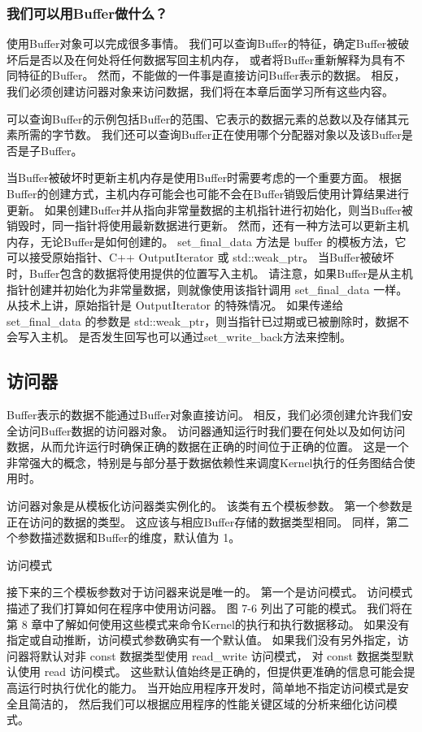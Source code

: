 \subsubsection{我们可以用Buffer做什么？}
使用Buffer对象可以完成很多事情。 我们可以查询Buffer的特征，确定Buffer被破坏后是否以及在何处将任何数据写回主机内存，
或者将Buffer重新解释为具有不同特征的Buffer。 然而，不能做的一件事是直接访问Buffer表示的数据。 
相反，我们必须创建访问器对象来访问数据，我们将在本章后面学习所有这些内容。

可以查询Buffer的示例包括Buffer的范围、它表示的数据元素的总数以及存储其元素所需的字节数。 
我们还可以查询Buffer正在使用哪个分配器对象以及该Buffer是否是子Buffer。

当Buffer被破坏时更新主机内存是使用Buffer时需要考虑的一个重要方面。 
根据Buffer的创建方式，主机内存可能会也可能不会在Buffer销毁后使用计算结果进行更新。 
如果创建Buffer并从指向非常量数据的主机指针进行初始化，则当Buffer被销毁时，同一指针将使用最新数据进行更新。 
然而，还有一种方法可以更新主机内存，无论Buffer是如何创建的。 
set\_final\_data 方法是 buffer 的模板方法，它可以接受原始指针、C++ OutputIterator 或 std::weak\_ptr。 
当Buffer被破坏时，Buffer包含的数据将使用提供的位置写入主机。 
请注意，如果Buffer是从主机指针创建并初始化为非常量数据，则就像使用该指针调用 set\_final\_data 一样。 
从技术上讲，原始指针是 OutputIterator 的特殊情况。 
如果传递给 set\_final\_data 的参数是 std::weak\_ptr，则当指针已过期或已被删除时，数据不会写入主机。 
是否发生回写也可以通过set\_write\_back方法来控制。

\subsection{访问器}
Buffer表示的数据不能通过Buffer对象直接访问。 相反，我们必须创建允许我们安全访问Buffer数据的访问器对象。 
访问器通知运行时我们要在何处以及如何访问数据，从而允许运行时确保正确的数据在正确的时间位于正确的位置。 
这是一个非常强大的概念，特别是与部分基于数据依赖性来调度Kernel执行的任务图结合使用时。

访问器对象是从模板化访问器类实例化的。 该类有五个模板参数。 第一个参数是正在访问的数据的类型。 
这应该与相应Buffer存储的数据类型相同。 同样，第二个参数描述数据和Buffer的维度，默认值为 1。

{\color{red} 访问模式}

接下来的三个模板参数对于访问器来说是唯一的。 第一个是访问模式。 访问模式描述了我们打算如何在程序中使用访问器。 
图 7-6 列出了可能的模式。 我们将在第 8 章中了解如何使用这些模式来命令Kernel的执行和执行数据移动。
如果没有指定或自动推断，访问模式参数确实有一个默认值。 
如果我们没有另外指定，访问器将默认对非 const 数据类型使用 read\_write 访问模式，
对 const 数据类型默认使用 read 访问模式。 
这些默认值始终是正确的，但提供更准确的信息可能会提高运行时执行优化的能力。 
当开始应用程序开发时，简单地不指定访问模式是安全且简洁的，
然后我们可以根据应用程序的性能关键区域的分析来细化访问模式。

